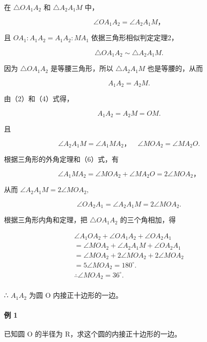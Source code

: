 在 \(\triangle OA_{1}A_{2}\) 和 \(\triangle A_{2}A_{1}M\) 中，

\[
\angle O A _ {1} A _ {2} = \angle A _ {2} A _ {1} M\text{，}
\]

且 \(OA_{1}: A_{1}A_{2} = A_{1}A_{2}: MA_{1}\) 依据三角形相似判定定理2，

\[
\triangle O A _ {1} A _ {2} \sim \triangle A _ {2} A _ {1} M.
\]

因为 \(\triangle OA_{1}A_{2}\) 是等腰三角形，所以
\(\triangle A_{2}A_{1}M\) 也是等腰的，从而

\[
A _ {1} A _ {2} = A _ {2} M. \tag {4}
\]

由（2）和（4）式得，

\[
A _ {1} A _ {2} = A _ {2} M = O M. \tag {5}
\]

且

\[
\angle A _ {2} A _ {1} M = \angle A _ {1} M A _ {2}\text{，} \quad \angle M O A _ {2} = \angle M A _ {2} O. \tag {6}
\]

根据三角形的外角定理和（6）式，有

\[
\angle A _ {1} M A _ {2} = \angle M O A _ {2} + \angle M A _ {2} O = 2 \angle M O A _ {2}\text{，}
\]

从而 \(\angle A_{2}A_{1}M = 2\angle MOA_{2},\)

\[
\angle O A _ {2} A _ {1} = \angle A _ {2} A _ {1} M = 2 \angle M O A _ {2}.
\]

根据三角形内角和定理，把 \(\triangle OA_{1}A_{2}\) 的三个角相加，得

\[
\begin{array}{l} \angle A _ {1} O A _ {2} + \angle O A _ {1} A _ {2} + \angle O A _ {2} A _ {1} \\ = \angle M O A _ {2} + \angle A _ {2} A _ {1} M + \angle O A _ {2} A _ {1} \\ = \angle M O A _ {2} + 2 \angle M O A _ {2} + 2 \angle M O A _ {2} \\ = 5 \angle M O A _ {2} = 180 ^ {\circ}. \\ \therefore \angle M O A _ {2} = 36 ^ {\circ}. \\ \end{array}
\]

∴ \(A_{1}A_{2}\) 为圆 O 内接正十边形的一边。

\paragraph{例 1}

已知圆 O 的半径为 R，求这个圆的内接正十边形的一边。

